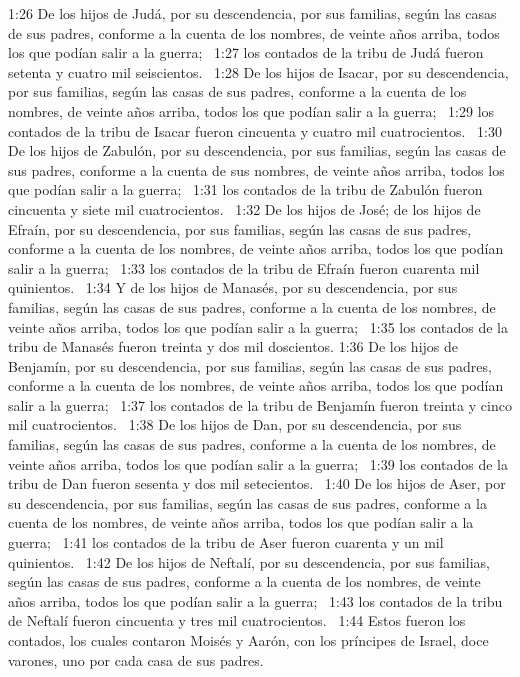 1:26 De los hijos de Judá, por su descendencia, por sus familias, según las casas de sus padres, conforme a la cuenta de los nombres, de veinte años arriba, todos los que podían salir a la guerra;  
1:27 los contados de la tribu de Judá fueron setenta y cuatro mil seiscientos.  
1:28 De los hijos de Isacar, por su descendencia, por sus familias, según las casas de sus padres, conforme a la cuenta de los nombres, de veinte años arriba, todos los que podían salir a la guerra;  
1:29 los contados de la tribu de Isacar fueron cincuenta y cuatro mil cuatrocientos.  
1:30 De los hijos de Zabulón, por su descendencia, por sus familias, según las casas de sus padres, conforme a la cuenta de sus nombres, de veinte años arriba, todos los que podían salir a la guerra;  
1:31 los contados de la tribu de Zabulón fueron cincuenta y siete mil cuatrocientos.  
1:32 De los hijos de José; de los hijos de Efraín, por su descendencia, por sus familias, según las casas de sus padres, conforme a la cuenta de los nombres, de veinte años arriba, todos los que podían salir a la guerra;  
1:33 los contados de la tribu de Efraín fueron cuarenta mil quinientos.  
1:34 Y de los hijos de Manasés, por su descendencia, por sus familias, según las casas de sus padres, conforme a la cuenta de los nombres, de veinte años arriba, todos los que podían salir a la guerra;  
1:35 los contados de la tribu de Manasés fueron treinta y dos mil doscientos. 
1:36 De los hijos de Benjamín, por su descendencia, por sus familias, según las casas de sus padres, conforme a la cuenta de los nombres, de veinte años arriba, todos los que podían salir a la guerra;  
1:37 los contados de la tribu de Benjamín fueron treinta y cinco mil cuatrocientos.  
1:38 De los hijos de Dan, por su descendencia, por sus familias, según las casas de sus padres, conforme a la cuenta de los nombres, de veinte años arriba, todos los que podían salir a la guerra;  
1:39 los contados de la tribu de Dan fueron sesenta y dos mil setecientos.  
1:40 De los hijos de Aser, por su descendencia, por sus familias, según las casas de sus padres, conforme a la cuenta de los nombres, de veinte años arriba, todos los que podían salir a la guerra;  
1:41 los contados de la tribu de Aser fueron cuarenta y un mil quinientos.  
1:42 De los hijos de Neftalí, por su descendencia, por sus familias, según las casas de sus padres, conforme a la cuenta de los nombres, de veinte años arriba, todos los que podían salir a la guerra;  
1:43 los contados de la tribu de Neftalí fueron cincuenta y tres mil cuatrocientos.  
1:44 Estos fueron los contados, los cuales contaron Moisés y Aarón, con los príncipes de Israel, doce varones, uno por cada casa de sus padres.  
